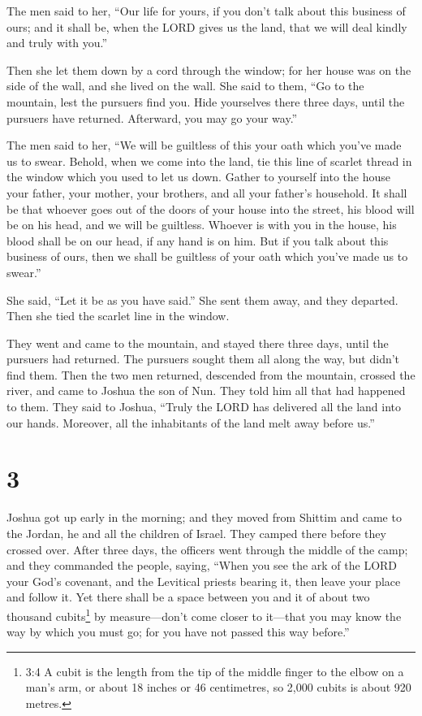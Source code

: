  The men said to her, ``Our life for yours, if you don't
talk about this business of ours; and it shall be, when the LORD gives
us the land, that we will deal kindly and truly with you.''

 Then she let them down by a cord through the window; for
her house was on the side of the wall, and she lived on the wall.
 She said to them, ``Go to the mountain, lest the pursuers
find you. Hide yourselves there three days, until the pursuers have
returned. Afterward, you may go your way.''

 The men said to her, ``We will be guiltless of this your
oath which you've made us to swear.  Behold, when we come
into the land, tie this line of scarlet thread in the window which you
used to let us down. Gather to yourself into the house your father, your
mother, your brothers, and all your father's household.  It
shall be that whoever goes out of the doors of your house into the
street, his blood will be on his head, and we will be guiltless. Whoever
is with you in the house, his blood shall be on our head, if any hand is
on him.  But if you talk about this business of ours, then
we shall be guiltless of your oath which you've made us to swear.''

 She said, ``Let it be as you have said.'' She sent them
away, and they departed. Then she tied the scarlet line in the window.

 They went and came to the mountain, and stayed there three
days, until the pursuers had returned. The pursuers sought them all
along the way, but didn't find them.  Then the two men
returned, descended from the mountain, crossed the river, and came to
Joshua the son of Nun. They told him all that had happened to them.
 They said to Joshua, ``Truly the LORD has delivered all
the land into our hands. Moreover, all the inhabitants of the land melt
away before us.''

\hypertarget{section-2}{%
\section{3}\label{section-2}}

 Joshua got up early in the morning; and they moved from
Shittim and came to the Jordan, he and all the children of Israel. They
camped there before they crossed over.  After three days,
the officers went through the middle of the camp;  and they
commanded the people, saying, ``When you see the ark of the LORD your
God's covenant, and the Levitical priests bearing it, then leave your
place and follow it.  Yet there shall be a space between you
and it of about two thousand cubits\footnote{3:4 A cubit is the length
  from the tip of the middle finger to the elbow on a man's arm, or
  about 18 inches or 46 centimetres, so 2,000 cubits is about 920
  metres.} by measure---don't come closer to it---that you may know the
way by which you must go; for you have not passed this way before.''

